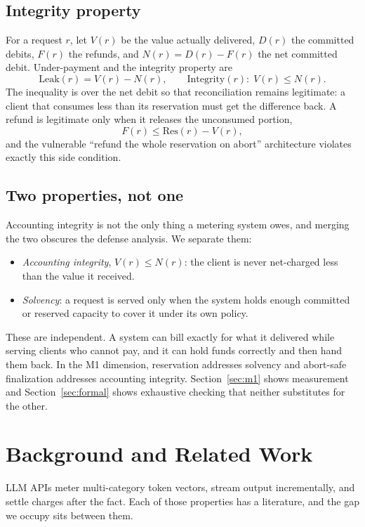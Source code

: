 \documentclass[preprint,3p,authoryear,12pt]{elsarticle}
\begin{document}
\subsection{Integrity property}
For a request $r$, let $V(r)$ be the value actually delivered, $D(r)$ the committed
debits, $F(r)$ the refunds, and $N(r) = D(r) - F(r)$ the net committed debit.
Under-payment and the integrity property are
\begin{equation}
\mathrm{Leak}(r) = V(r) - N(r), \qquad
\mathrm{Integrity}(r):\; V(r) \le N(r).
\label{eq:integrity}
\end{equation}
The inequality is over the net debit so that reconciliation remains legitimate: a client
that consumes less than its reservation must get the difference back. A refund is
legitimate only when it releases the unconsumed portion,
\begin{equation}
F(r) \le \mathrm{Res}(r) - V(r),
\label{eq:refund}
\end{equation}
and the vulnerable ``refund the whole reservation on abort'' architecture violates
exactly this side condition.

\subsection{Two properties, not one}
Accounting integrity is not the only thing a metering system owes, and merging the two
obscures the defense analysis. We separate them:
\begin{itemize}
\item \textit{Accounting integrity}, $V(r) \le N(r)$: the client is never net-charged
less than the value it received.
\item \textit{Solvency}: a request is served only when the system holds enough committed
or reserved capacity to cover it under its own policy.
\end{itemize}
These are independent. A system can bill exactly for what it delivered while serving
clients who cannot pay, and it can hold funds correctly and then hand them back. In the
M1 dimension, reservation addresses solvency and abort-safe finalization addresses
accounting integrity. Section~\ref{sec:m1} shows measurement and Section~\ref{sec:formal}
shows exhaustive checking that neither substitutes for the other.

\section{Background and Related Work}
\label{sec:related}
LLM APIs meter multi-category token vectors, stream output incrementally, and settle
charges after the fact. Each of those properties has a literature, and the gap we occupy
sits between them.
\end{document}
